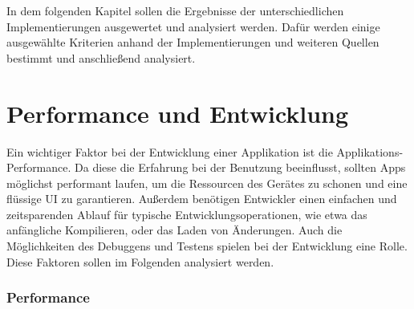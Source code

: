 In dem folgenden Kapitel sollen die Ergebnisse der unterschiedlichen Implementierungen ausgewertet und analysiert werden. Dafür werden einige ausgewählte Kriterien anhand der Implementierungen und weiteren Quellen bestimmt und anschließend analysiert.

\section{Performance und Entwicklung}
Ein wichtiger Faktor bei der Entwicklung einer Applikation ist die Applikations-Performance. Da diese die Erfahrung bei der Benutzung beeinflusst, sollten Apps möglichst performant laufen, um die Ressourcen des Gerätes zu schonen und eine flüssige UI zu garantieren. Außerdem benötigen Entwickler einen einfachen und zeitsparenden Ablauf für typische Entwicklungsoperationen, wie etwa das anfängliche Kompilieren, oder das Laden von Änderungen. Auch die Möglichkeiten des Debuggens und Testens spielen bei der Entwicklung eine Rolle. Diese Faktoren sollen im Folgenden analysiert werden.

\subsubsection{Performance}

